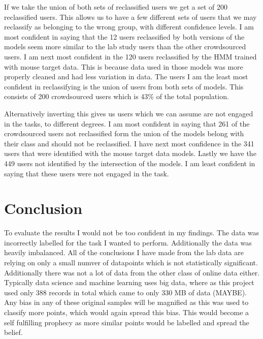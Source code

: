 \documentclass{article}
\begin{document}
If we take the union of both sets of reclassified users we get a set of 200 reclassified users.
This allows us to have a few different sets of users that we may reclassify as belonging to the wrong group, with different confidence levels.
I am most confident in saying that the 12 users reclassified by both versions of the models seem more similar to the lab study users than the other crowdsourced users.
I am next most confident in the 120 users reclassified by the HMM trained with mouse target data.
This is because data used in those models was more properly cleaned and had less variation in data.
The users I am the least most confident in reclassifying is the union of users from both sets of models.
This consists of 200 crowdsourced users which is 43\% of the total population.

Alternatively inverting this gives us users which we can assume are not engaged in the tasks, to different degrees.
I am most confident in saying that 261 of the crowdsourced users not reclassified form the union of the models belong with their class and should not be reclassified.
I have next most confidence in the 341 users that were identified with the mouse target data models.
Lastly we have the 449 users not identified by the intersection of the models.
I am least confident in saying that these users were not engaged in the task.



\section{Conclusion}

To evaluate the results I would not be too confident in my findings.
The data was incorrectly labelled for the task I wanted to perform.
Additionally the data was heavily imbalanced.
All of the conclusions I have made from the lab data are relying on only a small numver of datapoints which is not statistically significant.
Additionally there was not a lot of data from the other class of online data either.
Typically data science and machine learning uses big data, where as this project used only 388 records in total which came to only 330 MB of data (MAYBE).
Any bias in any of these original samples will be magnified as this was used to classify more points, which would again spread this bias.
This would become a self fulfilling prophecy as more similar points would be labelled and spread the belief.
\end{document}
